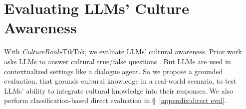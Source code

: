 \documentclass{article} %
\newcommand{\diyi}[1]{\textcolor{blue}{[#1 --diyi]}}
\newcommand{\dataname}{\textit{CultureBank}\xspace}
\begin{document}

 




\section{Evaluating LLMs' Culture Awareness}
\label{sec:main evaluation}
With \dataname-TikTok, we evaluate LLMs' cultural awareness. Prior work %
 asks LLMs to answer cultural true/false questions \citep{fung2024massively}. But LLMs are used in contextualized  settings like a dialogue agent. So we propose  a grounded evaluation, that grounds cultural knowledge in a real-world scenario, %
 to test LLMs' ability to integrate cultural knowledge into their responses. %
 We also perform classification-based direct evaluation in \S~\ref{appendix:direct eval}. %
\end{document}
